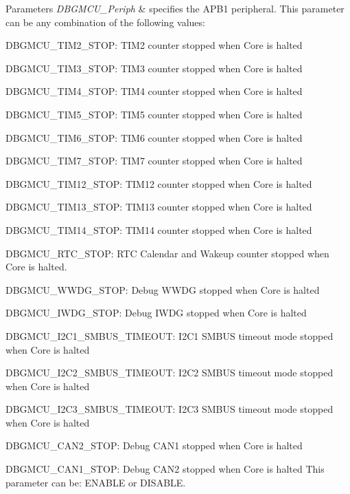 \begin{DoxyParams}{Parameters}
{\em D\+B\+G\+M\+C\+U\+\_\+\+Periph} & specifies the A\+P\+B1 peripheral. This parameter can be any combination of the following values\+: \begin{DoxyItemize}
\item D\+B\+G\+M\+C\+U\+\_\+\+T\+I\+M2\+\_\+\+S\+T\+OP\+: T\+I\+M2 counter stopped when Core is halted \item D\+B\+G\+M\+C\+U\+\_\+\+T\+I\+M3\+\_\+\+S\+T\+OP\+: T\+I\+M3 counter stopped when Core is halted \item D\+B\+G\+M\+C\+U\+\_\+\+T\+I\+M4\+\_\+\+S\+T\+OP\+: T\+I\+M4 counter stopped when Core is halted \item D\+B\+G\+M\+C\+U\+\_\+\+T\+I\+M5\+\_\+\+S\+T\+OP\+: T\+I\+M5 counter stopped when Core is halted \item D\+B\+G\+M\+C\+U\+\_\+\+T\+I\+M6\+\_\+\+S\+T\+OP\+: T\+I\+M6 counter stopped when Core is halted \item D\+B\+G\+M\+C\+U\+\_\+\+T\+I\+M7\+\_\+\+S\+T\+OP\+: T\+I\+M7 counter stopped when Core is halted \item D\+B\+G\+M\+C\+U\+\_\+\+T\+I\+M12\+\_\+\+S\+T\+OP\+: T\+I\+M12 counter stopped when Core is halted \item D\+B\+G\+M\+C\+U\+\_\+\+T\+I\+M13\+\_\+\+S\+T\+OP\+: T\+I\+M13 counter stopped when Core is halted \item D\+B\+G\+M\+C\+U\+\_\+\+T\+I\+M14\+\_\+\+S\+T\+OP\+: T\+I\+M14 counter stopped when Core is halted \item D\+B\+G\+M\+C\+U\+\_\+\+R\+T\+C\+\_\+\+S\+T\+OP\+: R\+TC Calendar and Wakeup counter stopped when Core is halted. \item D\+B\+G\+M\+C\+U\+\_\+\+W\+W\+D\+G\+\_\+\+S\+T\+OP\+: Debug W\+W\+DG stopped when Core is halted \item D\+B\+G\+M\+C\+U\+\_\+\+I\+W\+D\+G\+\_\+\+S\+T\+OP\+: Debug I\+W\+DG stopped when Core is halted \item D\+B\+G\+M\+C\+U\+\_\+\+I2\+C1\+\_\+\+S\+M\+B\+U\+S\+\_\+\+T\+I\+M\+E\+O\+UT\+: I2\+C1 S\+M\+B\+US timeout mode stopped when Core is halted \item D\+B\+G\+M\+C\+U\+\_\+\+I2\+C2\+\_\+\+S\+M\+B\+U\+S\+\_\+\+T\+I\+M\+E\+O\+UT\+: I2\+C2 S\+M\+B\+US timeout mode stopped when Core is halted \item D\+B\+G\+M\+C\+U\+\_\+\+I2\+C3\+\_\+\+S\+M\+B\+U\+S\+\_\+\+T\+I\+M\+E\+O\+UT\+: I2\+C3 S\+M\+B\+US timeout mode stopped when Core is halted \item D\+B\+G\+M\+C\+U\+\_\+\+C\+A\+N2\+\_\+\+S\+T\+OP\+: Debug C\+A\+N1 stopped when Core is halted \item D\+B\+G\+M\+C\+U\+\_\+\+C\+A\+N1\+\_\+\+S\+T\+OP\+: Debug C\+A\+N2 stopped when Core is halted This parameter can be\+: E\+N\+A\+B\+LE or D\+I\+S\+A\+B\+LE. \end{DoxyItemize}
\\
\hline
\end{DoxyParams}

